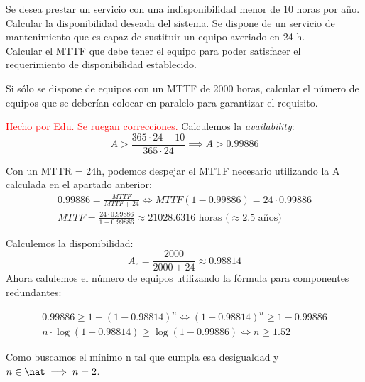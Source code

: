 \begin{problem}[2]
Se desea prestar un servicio con una indisponibilidad menor de 10 horas por año.
  \ppart Calcular la disponibilidad deseada del sistema.
  \ppart Se dispone de un servicio de mantenimiento que es capaz de sustituir un equipo averiado en 24 h.\\
Calcular el MTTF que debe tener el equipo para poder satisfacer el requerimiento de disponibilidad establecido.

  \ppart Si sólo se dispone de equipos con un MTTF de 2000 horas, calcular el número de equipos que se deberían colocar en paralelo para garantizar el requisito.

\solution
\textcolor{red}{Hecho por Edu. Se ruegan correcciones.}
\spart
  Calculemos la \textit{availability}:
  \[ A > \frac{365\cdot24-10}{365\cdot24} \implies A > 0.99886 \]

\spart
	Con un MTTR = 24h, podemos despejar el MTTF necesario utilizando la A calculada en el apartado anterior:
	\begin{gather*}
	0.99886 = \frac{\textit{MTTF}}{\textit{MTTF}+24} \iff \textit{MTTF}(1-0.99886)=24\cdot0.99886\\
	\textit{MTTF} = \frac{24\cdot0.99886}{1-0.99886} \approx 21028.6316 \text{ horas (} \approx\text{2.5 años)}
	\end{gather*}

\spart
	Calculemos la disponibilidad:
	\[ A_e = \frac{2000}{2000+24} \approx 0.98814 \]
	Ahora calulemos el número de equipos utilizando la fórmula para componentes redundantes:

	\begin{gather*}
	0.99886 \geq 1 - (1 - 0.98814)^n \iff (1 - 0.98814)^n \geq 1 - 0.99886\\
	n\cdot \log(1 - 0.98814) \geq  \log(1 - 0.99886) \iff n \geq 1.52
	\end{gather*}

	Como buscamos el mínimo n tal que cumpla esa desigualdad y $n \in \nat \implies n = 2$.

\end{problem}

